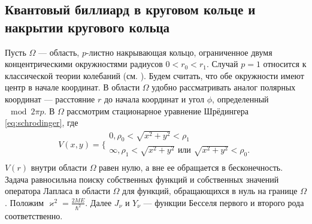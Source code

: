 \subsection{Квантовый биллиард в круговом кольце и накрытии кругового кольца}\label{sec:ch1/sec2/sub2}
Пусть  $\Omega$ --- область, $p$-листно накрывающая кольцо, 
ограниченное двумя концентрическими окружностями радиусов $0 < r_0 < r_1$. Случай $p=1$ относится к классической теории колебаний (см. \cite{wref11}). Будем считать, что обе окружности имеют центр в начале координат.
В  области $\Omega$ удобно рассматривать аналог полярных координат --- расстояние $r$ до начала координат и угол $\phi$, определенный  $\mod 2\pi p$. 
В $\Omega$ рассмотрим стационарное уравнение Шрёдингера \eqref{eq:schrodinger},
где 
\[
    V(x, y) = 
    \Bigg\{
    \begin{array}{cc}
        0, \rho_0 < \sqrt{x^2+y^2} < \rho_1 \\
        \infty, \rho_1 < \sqrt{x^2+y^2} \text{ или } \sqrt{x^2+y^2} < \rho_0.\\
    \end{array}
\] 
 $V(r)$ внутри области $\Omega$ равен нулю, а вне ее обращается в бесконечность. Задача равносильна поиску собственных функций и собственных значений оператора Лапласа в области $\Omega$ для функций, обращающихся в нуль на границе $\Omega$.
Положим  $\varkappa^2 = \frac{2 M E}{\hbar^2}$. Далее $J_\nu$  и $Y_\nu$ --- функции Бесселя первого и  второго рода соответственно.

